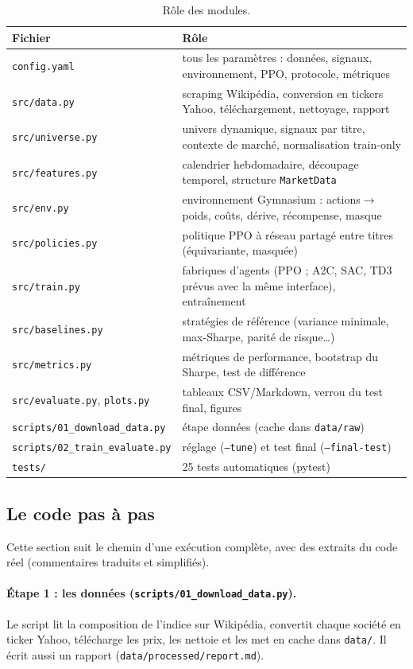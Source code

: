 \documentclass[11pt,a4paper]{article}
\begin{document}
\begin{table}[H]
\centering\small
\caption{Rôle des modules.}
\begin{tabularx}{\linewidth}{@{}lY@{}}
\toprule
Fichier & Rôle\\
\midrule
\texttt{config.yaml} & tous les paramètres : données, signaux, environnement, PPO, protocole, métriques\\
\texttt{src/data.py} & scraping Wikipédia, conversion en tickers Yahoo, téléchargement, nettoyage, rapport\\
\texttt{src/universe.py} & univers dynamique, signaux par titre, contexte de marché, normalisation train-only\\
\texttt{src/features.py} & calendrier hebdomadaire, découpage temporel, structure \texttt{MarketData}\\
\texttt{src/env.py} & environnement Gymnasium : actions\(\to\)poids, coûts, dérive, récompense, masque\\
\texttt{src/policies.py} & politique PPO à réseau partagé entre titres (équivariante, masquée)\\
\texttt{src/train.py} & fabriques d'agents (PPO ; A2C, SAC, TD3 prévus avec la même interface), entraînement\\
\texttt{src/baselines.py} & stratégies de référence (variance minimale, max-Sharpe, parité de risque\dots)\\
\texttt{src/metrics.py} & métriques de performance, bootstrap du Sharpe, test de différence\\
\texttt{src/evaluate.py}, \texttt{plots.py} & tableaux CSV/Markdown, verrou du test final, figures\\
\texttt{scripts/01\_download\_data.py} & étape données (cache dans \texttt{data/raw})\\
\texttt{scripts/02\_train\_evaluate.py} & réglage (\texttt{--tune}) et test final (\texttt{--final-test})\\
\texttt{tests/} & 25 tests automatiques (pytest)\\
\bottomrule
\end{tabularx}
\end{table}

\subsection{Le code pas à pas}
Cette section suit le chemin d'une exécution complète, avec des extraits du code réel (commentaires traduits et
simplifiés).

\paragraph{Étape 1 : les données (\texttt{scripts/01\_download\_data.py}).} Le script lit la composition de l'indice sur
Wikipédia, convertit chaque société en ticker Yahoo, télécharge les prix, les nettoie et les met en cache dans
\texttt{data/}. Il écrit aussi un rapport (\texttt{data/processed/report.md}).
\end{document}
